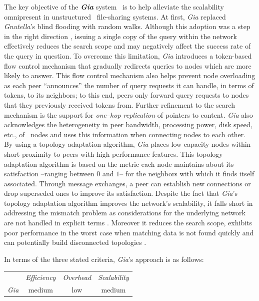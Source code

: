 The key objective of the \textbf{\emph{Gia}} system~\cite{CRBLS2003} is 
to help alleviate the scalability omnipresent
in unstructured \p\ file-sharing systems.
At first, \emph{Gia} replaced \emph{Gnutella}'s blind flooding 
with random walks.
Although this adoption was 
a step in the right direction \cite{LCCLS2002},
issuing a single copy of the query within the network
effectively reduces the search scope and may negatively affect 
the success rate of the query in question.
To overcome this limitation, \emph{Gia} introduces
a token-based flow control mechanism 
that gradually redirects queries to nodes which are more
likely to answer. This flow control mechanism also helps prevent node
overloading as each peer ``announces'' the number of query requests it 
can handle, in terms of tokens, to its neighbors; to this end, 
peers only forward query requests to nodes that they previously
received tokens from. Further refinement to the search mechanism is the
support for \emph{one--hop replication} of pointers to content.
\emph{Gia} also acknowledges the heterogeneity in peer bandwidth,
processing power, disk speed, etc., of \p\ nodes and uses this
information when connecting nodes to each other.
By using a topology adaptation algorithm, 
\emph{Gia} places low capacity nodes within 
short proximity to peers with high performance features.
This topology adaptation algorithm is based on the metric 
each node maintains about its satisfaction --ranging between $0$ and $1$--
for the neighbors with which it finds itself associated. 
Through message exchanges, a peer can establish new connections 
or drop superseded ones to improve its satisfaction.
Despite the fact that \emph{Gia}'s topology adaptation algorithm 
improves the network's
scalability, it falls short in addressing the mismatch problem
as considerations for the underlying network are not handled in explicit
terms \cite{LXLNZ2005}. Moreover it reduces the search scope, exhibits poor
performance in the worst case when matching data is not found quickly
\cite{PR2004,HJ2004} and can potentially build  disconnected topologies
\cite{MBL2006}.

In terms of the three stated criteria, \emph{Gia}'s approach is as follows:
\begin{center}
{\footnotesize
\begin{tabular}{rccc}
\multicolumn{1}{r}{} &
\multicolumn{1}{c}{\emph{Efficiency}} &
\multicolumn{1}{c}{\emph{Overhead}} &
\multicolumn{1}{c}{\emph{Scalability}}
\\
\cline{2-4}
\emph{Gia} &
medium &
low &
medium
\end{tabular}
}
\end{center}

